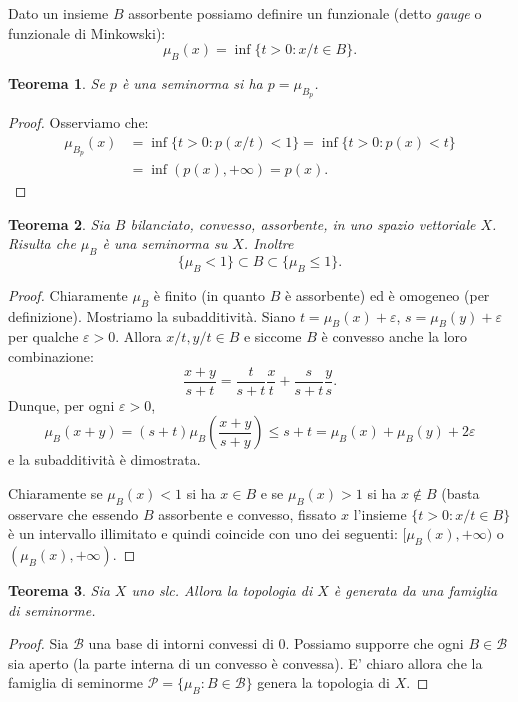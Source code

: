 \documentclass[italian,a4paper,oneside,headinclude]{scrbook}
\newcommand{\eps}{\varepsilon}
\newcommand{\B}{\mathcal B}
\renewcommand{\P}{\mathcal P}
\newtheorem{theorem}{Teorema}
\begin{document}
Dato un insieme $B$ assorbente possiamo definire
un funzionale (detto \emph{gauge} o funzionale di Minkowski):
\[
\mu_B(x) = \inf \{t>0 \colon x/t \in B \}.
\]

\begin{theorem}
  Se $p$ è una seminorma
  si ha $p=\mu_{B_p}$.
\end{theorem}

\begin{proof}
  Osserviamo che:
  \begin{align*}
    \mu_{B_p}(x)
    &= \inf \{t > 0\colon p(x/t) < 1\}
    = \inf \{t>0\colon p(x) < t\} \\
    & = \inf (p(x),+\infty) = p(x).
  \end{align*}
\end{proof}

\begin{theorem}
Sia $B$ bilanciato, convesso, assorbente, in uno spazio vettoriale
$X$.
Risulta che $\mu_B$ è una seminorma su $X$. Inoltre
\[
\{\mu_B < 1\} \subset   B\subset \{\mu_B \le 1\}.
\]
\end{theorem}
\begin{proof}
Chiaramente $\mu_B$ è finito (in quanto $B$ è assorbente) ed è omogeneo
(per definizione).
Mostriamo la subadditività.
Siano $t=\mu_B(x)+\eps$, $s=\mu_B(y)+\eps$ per qualche $\eps>0$.
Allora $x/t, y/t\in B$ e siccome $B$ è convesso anche la loro combinazione:
\[
\frac{x+y}{s+t} = \frac{t}{s+t} \frac{x}{t} + \frac{s}{s+t}\frac{y}{s}.
\]
Dunque, per ogni $\eps>0$,
\[
\mu_B(x+y) = (s+t)\mu_B\left(\frac{x+y}{s+y}\right) \le s+t = \mu_B(x)
+ \mu_B(y) + 2\eps
\]
e la subadditività è dimostrata.

Chiaramente se $\mu_B(x)<1$ si ha $x \in B$ e se $\mu_B(x)>1$ si ha
$x\not \in B$ (basta osservare che essendo $B$ assorbente e convesso,
fissato $x$
l'insieme $\{t>0 \colon x/t\in B\}$ è un intervallo illimitato e
quindi coincide con uno dei
seguenti: $[\mu_B(x),+\infty)$ o $(\mu_B(x),+\infty)$.
\end{proof}

\begin{theorem}
  Sia $X$ uno slc. Allora la topologia di $X$ è generata da una famiglia
  di seminorme.
\end{theorem}
\begin{proof}
  Sia $\B$ una base di intorni convessi di $0$. Possiamo supporre che ogni
  $B\in \B$ sia aperto (la parte interna di un convesso è convessa).
  E' chiaro allora che la famiglia di seminorme
  $\P=\{\mu_B \colon B\in \B\}$ genera la topologia di $X$.
\end{proof}
\end{document}
